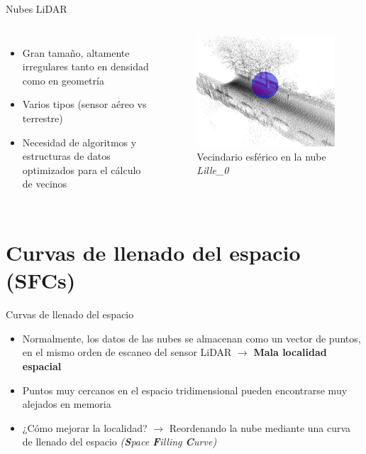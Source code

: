 \documentclass[aspectratio=169]{beamer}
\begin{document}
\begin{frame}{Nubes LiDAR}
    \begin{columns}
            \begin{itemize}
                \item Gran tamaño, altamente irregulares tanto en densidad como en geometría
                \item Varios tipos (sensor aéreo vs terrestre)
                \item Necesidad de algoritmos y estructuras de datos optimizados para el cálculo de vecinos
            \end{itemize}        
        \begin{figure}
            \centering
            \includegraphics[scale=0.65]{img/vecindario_lille.png}
            \caption{Vecindario esférico en la nube \textit{Lille\_0}}
        \end{figure}
    \end{columns}
\end{frame}

\section{Curvas de llenado del espacio (SFCs)}
\begin{frame}{Curvas de llenado del espacio}
    \begin{itemize}
        \item Normalmente, los datos de las nubes se almacenan como un vector de puntos, en el mismo orden de escaneo del sensor LiDAR $\rightarrow$ \textbf{Mala localidad espacial} 
        \item Puntos muy cercanos en el espacio tridimensional pueden encontrarse muy alejados en memoria
        \item ¿Cómo mejorar la localidad? $\rightarrow$ Reordenando la nube mediante una curva de llenado del espacio \textit{(\textbf{S}pace \textbf{F}illing \textbf{C}urve)} \cite{asano1997space}
    \end{itemize}
\end{frame}
\end{document}
